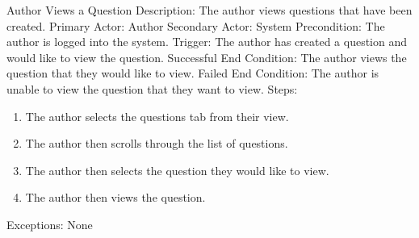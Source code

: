     
    \begin{section}{Author Views a Question}
        Description: The author views questions that have been created. \newline
        Primary Actor: Author \newline
        Secondary Actor: System \newline
        Precondition: The author is logged into the system. \newline
        Trigger: The author has created a question and would like to view the question. \newline
        Successful End Condition: The author views the question that they would like to view. \newline
        Failed End Condition: The author is unable to view the question that they want to view. \newline
        \newline
        Steps:
        \begin{enumerate}
            \item{The author selects the questions tab from their view.}
            \item{The author then scrolls through the list of questions.}
            \item{The author then selects the question they would like to view.}
            \item{The author then views the question.}
        \end{enumerate}
        Exceptions: None
    \end{section}
    
